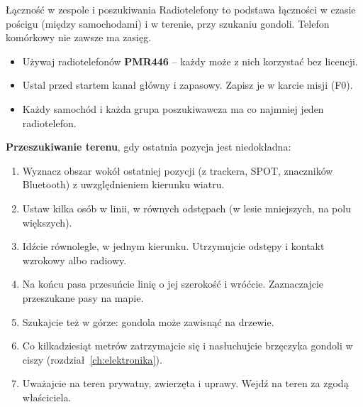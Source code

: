 \begin{sekcja}{Łączność w zespole i poszukiwania}\label{sec:lacznosc-zespol}
Radiotelefony to podstawa łączności w czasie pościgu (między samochodami) i w terenie, przy szukaniu gondoli. Telefon komórkowy nie zawsze ma zasięg.

\begin{itemize}
  \item Używaj radiotelefonów \textbf{PMR446} -- każdy może z nich korzystać bez licencji.
  \item Ustal przed startem kanał główny i zapasowy. Zapisz je w karcie misji (F0).
  \item Każdy samochód i każda grupa poszukiwawcza ma co najmniej jeden radiotelefon.
\end{itemize}

\textbf{Przeszukiwanie terenu}, gdy ostatnia pozycja jest niedokładna:
\begin{enumerate}
  \item Wyznacz obszar wokół ostatniej pozycji (z trackera, SPOT, znaczników Bluetooth) z uwzględnieniem kierunku wiatru.
  \item Ustaw kilka osób w linii, w równych odstępach (w lesie mniejszych, na polu większych).
  \item Idźcie równolegle, w jednym kierunku. Utrzymujcie odstępy i kontakt wzrokowy albo radiowy.
  \item Na końcu pasa przesuńcie linię o jej szerokość i wróćcie. Zaznaczajcie przeszukane pasy na mapie.
  \item Szukajcie też w górze: gondola może zawisnąć na drzewie.
  \item Co kilkadziesiąt metrów zatrzymajcie się i nasłuchujcie brzęczyka gondoli w ciszy (rozdział~\ref{ch:elektronika}).
  \item Uważajcie na teren prywatny, zwierzęta i uprawy. Wejdź na teren za zgodą właściciela.
\end{enumerate}
\end{sekcja}

